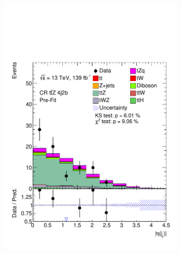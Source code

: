 \begin{figure}[!h]
\begin{subfigure}[b]{0.33\linewidth}
    \includegraphics[width=\linewidth]{ubonn-thesis/Chapters/Chapters_06/Figure/Input_distribution/CR_4j2b_etajf.pdf} 
  \end{subfigure}
  \begin{subfigure}[b]{0.33\linewidth}
    \centering

\end{subfigure}
\end{figure}
